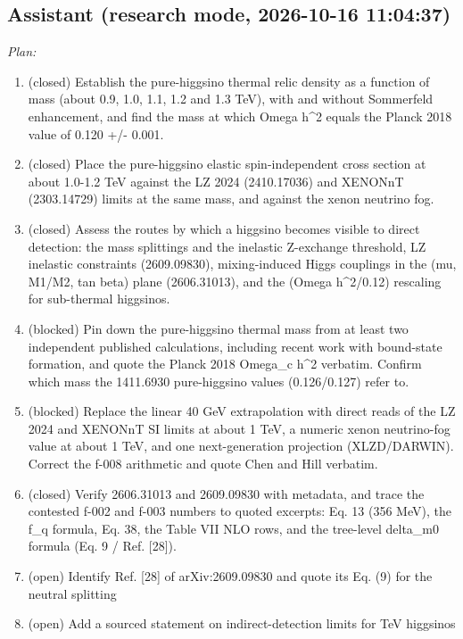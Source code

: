 \documentclass[11pt,a4paper]{article}
\begin{document}
\subsection*{Assistant \small(research mode, 2026-10-16 11:04:37)}
\textit{Plan:}\begin{enumerate}
  \item (closed) Establish the pure-higgsino thermal relic density as a function of mass (about 0.9, 1.0, 1.1, 1.2 and 1.3 TeV), with and without Sommerfeld enhancement, and find the mass at which Omega h\textasciicircum{}2 equals the Planck 2018 value of 0.120 +/- 0.001.
  \item (closed) Place the pure-higgsino elastic spin-independent cross section at about 1.0-1.2 TeV against the LZ 2024 (2410.17036) and XENONnT (2303.14729) limits at the same mass, and against the xenon neutrino fog.
  \item (closed) Assess the routes by which a higgsino becomes visible to direct detection: the mass splittings and the inelastic Z-exchange threshold, LZ inelastic constraints (2609.09830), mixing-induced Higgs couplings in the (mu, M1/M2, tan beta) plane (2606.31013), and the (Omega h\textasciicircum{}2/0.12) rescaling for sub-thermal higgsinos.
  \item (blocked) Pin down the pure-higgsino thermal mass from at least two independent published calculations, including recent work with bound-state formation, and quote the Planck 2018 Omega\_c h\textasciicircum{}2 verbatim. Confirm which mass the 1411.6930 pure-higgsino values (0.126/0.127) refer to.
  \item (blocked) Replace the linear 40 GeV extrapolation with direct reads of the LZ 2024 and XENONnT SI limits at about 1 TeV, a numeric xenon neutrino-fog value at about 1 TeV, and one next-generation projection (XLZD/DARWIN). Correct the f-008 arithmetic and quote Chen and Hill verbatim.
  \item (closed) Verify 2606.31013 and 2609.09830 with metadata, and trace the contested f-002 and f-003 numbers to quoted excerpts: Eq. 13 (356 MeV), the f\_q formula, Eq. 38, the Table VII NLO rows, and the tree-level delta\_m0 formula (Eq. 9 / Ref. [28]).
  \item (open) Identify Ref. [28] of arXiv:2609.09830 and quote its Eq. (9) for the neutral splitting
  \item (open) Add a sourced statement on indirect-detection limits for TeV higgsinos
\end{enumerate}
\end{document}
